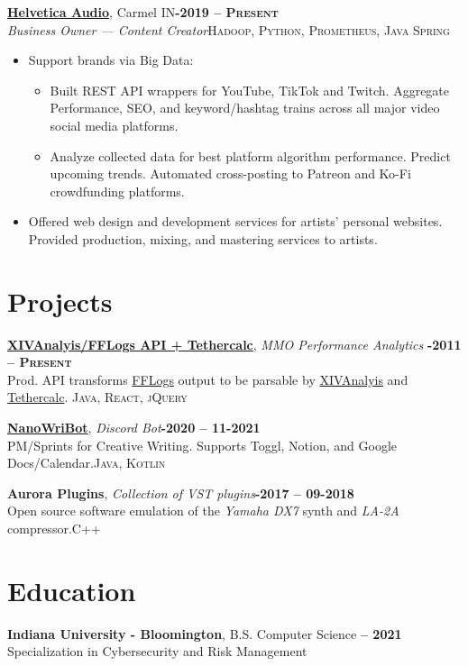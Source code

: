 \documentclass[margin,10pt]{res}
\begin{document}
\begin{resume}
    \href{}{\textbf{Helvetica Audio}}, Carmel IN\hfill \textsc{\bfseries{}-2019 -- Present}\\
    \textit{Business Owner --- Content Creator}\hfill \textsc{Hadoop, Python, Prometheus, Java Spring}
    \vspace{0.5em}
    \begin{itemize}
        \item Support brands via Big Data:
        \begin{itemize}
            \item Built REST API wrappers for YouTube, TikTok and Twitch. Aggregate Performance, SEO, and keyword/hashtag trains across all major video social media platforms. 
            \item Analyze collected data for best platform algorithm performance. Predict upcoming trends. Automated cross-posting to Patreon and Ko-Fi crowdfunding platforms. 
        \end{itemize}
        \item Offered web design and development services for artists' personal websites. Provided production, mixing, and mastering services to artists. 
    \end{itemize}
\section{\sc \lsstyle Projects}
    \href{https://tethercalc.herokuapp.com/}{\textbf{XIVAnalyis/FFLogs API + Tethercalc}}, \textit{MMO Performance Analytics} \hfill \textsc{\bfseries{}-2011 -- Present}\\
    Prod. API transforms \href{https://www.fflogs.com/}{FFLogs}  output to be parsable by \href{https://xivanalysis.com/}{XIVAnalyis}  and \href{https://tethercalc.herokuapp.com/}{Tethercalc}. \hfill \textsc{Java, React, jQuery}

    \href{https://github.com/spiffytech/DoomBot}{\textbf{NanoWriBot}}, \textit{Discord Bot}\hfill \textsc{\bfseries{}-2020 -- 11-2021}\\
    PM/Sprints for Creative Writing. Supports Toggl, Notion, and Google Docs/Calendar.\hfill \textsc{Java, Kotlin}

    \textbf{Aurora Plugins}, \textit{Collection of VST plugins}\hfill \textsc{\bfseries{}-2017 -- 09-2018}\\
    Open source software emulation of the {\em Yamaha DX7} synth and {\em LA-2A} compressor.\hfill \textsc{C++}

\section{\sc \lsstyle Education}
    \textbf{Indiana University - Bloomington}, B.S. Computer Science \hfill \textsc{\bfseries{} -- 2021}\\
    Specialization in Cybersecurity and Risk Management\hfill\\

\end{resume}
\end{document}

